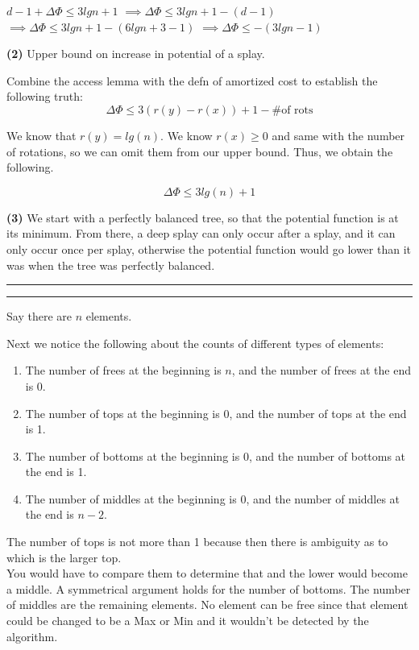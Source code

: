 \documentclass[11pt]{article}
\newcommand{\question}[2] {\vspace{.25in} \hrule\vspace{0.5em}
\noindent{\bf #1: #2} \vspace{0.5em}
\hrule \vspace{.10in}}
\renewcommand{\part}[1] {\vspace{.10in} {\bf (#1)}}
\begin{document}
$ d-1 + \Delta \Phi \leq 3 lg n + 1$
$ \implies \Delta \Phi \leq 3 lg n + 1 - (d - 1)$
$ \implies  \Delta \Phi \leq 3 lg n + 1 - (6 lg n + 3 - 1)$
$ \implies  \Delta \Phi \leq - (3 lg n - 1)$

\part{2} Upper bound on increase in potential of a splay.

Combine the access lemma with the defn of amortized cost to establish the following truth:
$$ \Delta \Phi \leq 3 (r(y) - r(x)) + 1 - \text{\# of rots}$$

We know that $r(y) = lg(n)$. We know $r(x) \geq 0$ and same with the number of rotations, so we can omit them from our upper bound.
Thus, we obtain the following.

$$ \Delta \Phi \leq 3 lg(n)  + 1$$

\part{3} 
We start with a perfectly balanced tree, so that the potential function is at its minimum.
From there, a deep splay can only occur after a splay, and it can only occur once per splay, otherwise the potential function would go lower than it was when the tree was perfectly balanced.




\question{2}{You Be the Adversary}

Say there are $n$ elements.

Next we notice the following about the counts of different types of elements:

\begin{enumerate}
\item The number of frees at the beginning is $n$, and the number of frees at the end is 0.
\item The number of tops at the beginning is $0$, and the number of tops at the end is 1.
\item The number of bottoms at the beginning is $0$, and the number of bottoms at the end is 1.
\item The number of middles at the beginning is $0$, and the number of middles at the end is $n-2$.
\end{enumerate}

The number of tops is not more than 1 because then there is ambiguity as to which is the larger top.\\
You would have to compare them to determine that and the lower would become a middle. A symmetrical argument
holds for the number of bottoms. The number of middles are the remaining elements. No element can be free
since that element could be changed to be a Max or Min and it wouldn't be detected by the algorithm.
\end{document}
